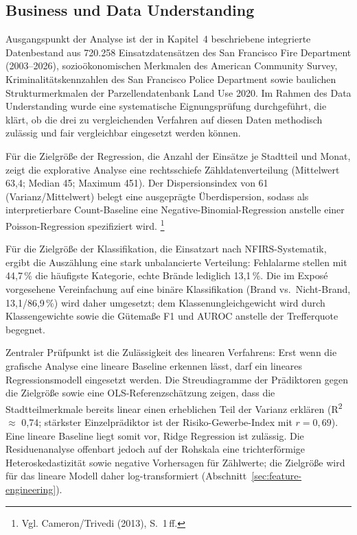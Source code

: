 \subsection{Business und Data Understanding}
\label{sec:business-data-understanding}

Ausgangspunkt der Analyse ist der in Kapitel~4 beschriebene integrierte
Datenbestand aus 720.258 Einsatzdatensätzen des San Francisco Fire Department
(2003--2026), sozioökonomischen Merkmalen des American Community Survey,
Kriminalitätskennzahlen des San Francisco Police Department sowie baulichen
Strukturmerkmalen der Parzellendatenbank Land Use 2020. Im Rahmen des Data
Understanding wurde eine systematische Eignungsprüfung durchgeführt, die
klärt, ob die drei zu vergleichenden Verfahren auf diesen Daten methodisch
zulässig und fair vergleichbar eingesetzt werden können.

Für die Zielgröße der Regression, die Anzahl der Einsätze je Stadtteil und
Monat, zeigt die explorative Analyse eine rechtsschiefe Zähldatenverteilung
(Mittelwert 63,4; Median 45; Maximum 451). Der Dispersionsindex von 61
(Varianz/Mittelwert) belegt eine ausgeprägte Überdispersion, sodass als
interpretierbare Count-Baseline eine Negative-Binomial-Regression anstelle
einer Poisson-Regression spezifiziert wird.%
\footnote{Vgl. Cameron/Trivedi (2013), S.~1\,ff.}

Für die Zielgröße der Klassifikation, die Einsatzart nach NFIRS-Systematik,
ergibt die Auszählung eine stark unbalancierte Verteilung: Fehlalarme stellen
mit 44,7\,\% die häufigste Kategorie, echte Brände lediglich 13,1\,\%. Die im
Exposé vorgesehene Vereinfachung auf eine binäre Klassifikation
(Brand vs.\ Nicht-Brand, 13,1/86,9\,\%) wird daher umgesetzt; dem
Klassenungleichgewicht wird durch Klassengewichte sowie die Gütemaße F1 und
AUROC anstelle der Trefferquote begegnet.

Zentraler Prüfpunkt ist die Zulässigkeit des linearen Verfahrens: Erst wenn
die grafische Analyse eine lineare Baseline erkennen lässt, darf ein lineares
Regressionsmodell eingesetzt werden. Die Streudiagramme der Prädiktoren gegen
die Zielgröße sowie eine OLS-Referenzschätzung zeigen, dass die
Stadtteilmerkmale bereits linear einen erheblichen Teil der Varianz erklären
(R\textsuperscript{2} $\approx$ 0{,}74; stärkster Einzelprädiktor ist der
Risiko-Gewerbe-Index mit $r = 0{,}69$). Eine lineare Baseline liegt somit vor,
Ridge Regression ist zulässig. Die Residuenanalyse offenbart jedoch auf der
Rohskala eine trichterförmige Heteroskedastizität sowie negative Vorhersagen
für Zählwerte; die Zielgröße wird für das lineare Modell daher
log-transformiert (Abschnitt~\ref{sec:feature-engineering}).


